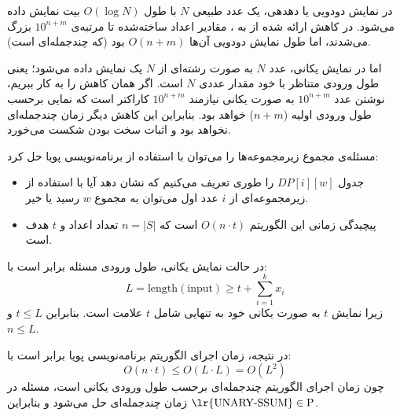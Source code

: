 در نمایش دودویی یا دهدهی، یک عدد طبیعی $N$ با طول $O(\log N)$ بیت نمایش داده می‌شود. در کاهش ارائه شده از  به ، مقادیر اعداد ساخته‌شده تا مرتبه‌ی $10^{n+m}$ بزرگ می‌شدند، اما طول نمایش دودویی آن‌ها $O(n+m)$ بود (که چندجمله‌ای است).

اما در نمایش یکانی، عدد $N$ به صورت رشته‌ای از $N$ یک نمایش داده می‌شود؛ یعنی طول ورودی متناظر با خود مقدار عددی $N$ است. اگر همان کاهش را به کار ببریم، نوشتن عدد $10^{n+m}$ به صورت یکانی نیازمند $10^{n+m}$ کاراکتر است که نمایی برحسب طول ورودی اولیه ($n+m$) خواهد بود. بنابراین این کاهش دیگر زمان چندجمله‌ای نخواهد بود و اثبات سخت بودن شکست می‌خورد.

مسئله‌ی مجموع زیرمجموعه‌ها را می‌توان با استفاده از برنامه‌نویسی پویا حل کرد:
\begin{itemize}
    \item جدول $DP[i][w]$ را طوری تعریف می‌کنیم که نشان دهد آیا با استفاده از زیرمجموعه‌ای از $i$ عدد اول می‌توان به مجموع $w$ رسید یا خیر.
    \item پیچیدگی زمانی این الگوریتم $O(n \cdot t)$ است که $n = |S|$ تعداد اعداد و $t$ هدف است.
\end{itemize}

در حالت نمایش یکانی، طول ورودی مسئله برابر است با:
\[
L = \text{length}(\text{input}) \ge t + \sum_{i=1}^k x_i
\]
زیرا نمایش $t$ به صورت یکانی خود به تنهایی شامل $t$ علامت است. بنابراین $t \le L$ و $n \le L$.

در نتیجه، زمان اجرای الگوریتم برنامه‌نویسی پویا برابر است با:
\[
O(n \cdot t) \le O(L \cdot L) = O(L^2)
\]
چون زمان اجرای الگوریتم چندجمله‌ای برحسب طول ورودی یکانی است، مسئله در زمان چندجمله‌ای حل می‌شود و بنابراین $\text{\lr{UNARY-SSUM}} \in \text{P}$.
